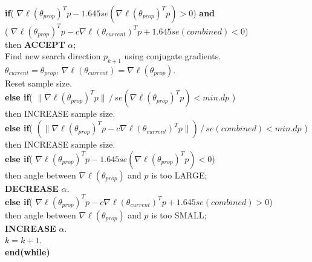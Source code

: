 \documentclass{amsbook}
\theoremstyle{definition}
\theoremstyle{remark}
\begin{document}
\noindent \textbf{if}( $\nabla \ell(\theta_{prop})^T p - 1.645 se \left( \nabla \ell
(\theta_{prop})^T p \right ) > 0$) \textbf{and} \\
\indent ( $\nabla \ell(\theta_{prop})^T p - c \nabla \ell(\theta_{current})^T p + 
1.645 se(combined) < 0$) \\
\indent then \textbf{ACCEPT} $\alpha$;  \\
\indent Find new search direction $p_{k+1}$ using conjugate gradients. \\
\indent	$\theta_{current} = \theta_{prop}$, $\nabla \ell(\theta_{current}) = \nabla 
\ell(\theta_{prop})$. \\
\indent Reset sample size. \\

\noindent \textbf{else if}( $\| \nabla \ell(\theta_{prop})^T p \| \, / \, se \left
( \nabla \ell(\theta_{prop})^T p \right ) < min.dp$ ) \\
\indent then INCREASE sample size. \\

\noindent \textbf{else if}( $\left( \| \nabla \ell(\theta_{prop})^T p - c \nabla \ell
(\theta_{current})^T p \| \right ) \, / \, se (combined ) < min.dp$ ) \\
\indent then INCREASE sample size. \\

\noindent \textbf{else if}( $\nabla \ell(\theta_{prop})^T p - 1.645 se \left( \nabla 
\ell(\theta_{prop})^T p \right ) < 0$) \\
\indent then angle between $\nabla \ell(\theta_{prop})$ and $p$ is too LARGE;\\ 
\indent \textbf{DECREASE} $\alpha$.\\

\noindent \textbf{else if}( $\nabla \ell(\theta_{prop})^T p - c \nabla \ell(\theta_
{current})^T p + 1.645 se(combined) > 0$) \\
\indent then angle between $\nabla \ell(\theta_{prop})$ and $p$ is too SMALL;\\ 
\indent \textbf{INCREASE} $\alpha$. \\

\noindent $k = k + 1$.  \\

\noindent \textbf{end(while)}
\end{document}

